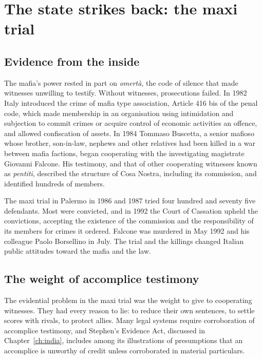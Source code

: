 \section{The state strikes back: the maxi trial}

\subsection{Evidence from the inside}

The mafia's power rested in part on \emph{omert\`a}, the code of silence that made witnesses unwilling to testify. Without witnesses, prosecutions failed. In 1982 Italy introduced the crime of mafia type association, Article 416 bis of the penal code, which made membership in an organisation using intimidation and subjection to commit crimes or acquire control of economic activities an offence, and allowed confiscation of assets. In 1984 Tommaso Buscetta, a senior mafioso whose brother, son-in-law, nephews and other relatives had been killed in a war between mafia factions, began cooperating with the investigating magistrate Giovanni Falcone. His testimony, and that of other cooperating witnesses known as \emph{pentiti}, described the structure of Cosa Nostra, including its commission, and identified hundreds of members.

The maxi trial in Palermo in 1986 and 1987 tried four hundred and seventy five defendants. Most were convicted, and in 1992 the Court of Cassation upheld the convictions, accepting the existence of the commission and the responsibility of its members for crimes it ordered. Falcone was murdered in May 1992 and his colleague Paolo Borsellino in July. The trial and the killings changed Italian public attitudes toward the mafia and the law.

\subsection{The weight of accomplice testimony}

The evidential problem in the maxi trial was the weight to give to cooperating witnesses. They had every reason to lie: to reduce their own sentences, to settle scores with rivals, to protect allies. Many legal systems require corroboration of accomplice testimony, and Stephen's Evidence Act, discussed in Chapter~\ref{ch:india}, includes among its illustrations of presumptions that an accomplice is unworthy of credit unless corroborated in material particulars.

